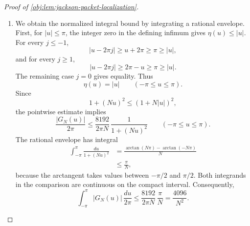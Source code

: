 \documentclass[11pt]{article}
\begin{document}
\begin{proof}[Proof of \cref{obj:lem:jackson-packet-localization}]
\begin{enumerate}
If \(N\eta(u)\leq1\), then
\[
(1+N\eta(u))^2\leq4,
\qquad
|G_N(u)|\leq\frac2N
\leq\frac{8192}{N(1+N\eta(u))^2}.
\]
This case includes \(\eta(u)=0\).

Suppose instead that \(N\eta(u)>1\), so \(\eta(u)>0\). For every integer
\(j_0\), shifting the finite Fourier sum gives
\[
\sum_j a_{j+j_0}^{(\varsigma)}e^{iju}
=e^{-ij_0u}\mathcal F_N^{\varsigma}(u).
\]
Applying this with shifts one and two yields
\[
\sum_j(\delta^2a^{(\varsigma)})_je^{iju}
=(e^{-iu}-1)^2\mathcal F_N^{\varsigma}(u).
\]
Therefore,
\[
|e^{-iu}-1|^2\,|\mathcal F_N^{\varsigma}(u)|
\leq\sum_j|(\delta^2a^{(\varsigma)})_j|
\leq\frac{512}{N^3}.
\]
Periodicity and the elementary sine bound on \([-\pi/2,\pi/2]\) give
\[
|e^{-iu}-1|
=2|\sin(\upsilon(u)/2)|
\geq\frac2\pi|\upsilon(u)|
\geq\frac2\pi\eta(u)
\geq\frac{\eta(u)}2,
\]
where the last inequality uses \(\pi\leq4\). It follows that
\[
|\mathcal F_N^{\varsigma}(u)|
\leq\frac{2048}{N^3\eta(u)^2}.
\]
Applying this estimate at \(u\) and \(-u\) in the representation of \(G_N\) gives
\[
|G_N(u)|\leq\frac{2048}{N^3\eta(u)^2}.
\]
Finally, \(N\eta(u)>1\) implies
\[
(1+N\eta(u))^2\leq4(N\eta(u))^2,
\]
and hence
\[
|G_N(u)|
\leq\frac{2048}{N^3\eta(u)^2}
\leq\frac{8192}{N(1+N\eta(u))^2}.
\]
Together, the two cases establish
\[
|G_N(u)|
\leq\frac{8192}{N(1+N\|u\|_{\mathbb T})^2}
\qquad(u\in\mathbb R).
\]

\item We obtain the normalized integral bound by integrating a rational envelope. First, for \(|u|\leq\pi\), the integer zero in the defining infimum gives
\(\eta(u)\leq|u|\). For every \(j\leq-1\),
\[
|u-2\pi j|\geq u+2\pi\geq\pi\geq|u|,
\]
and for every \(j\geq1\),
\[
|u-2\pi j|\geq2\pi-u\geq\pi\geq|u|.
\]
The remaining case \(j=0\) gives equality. Thus
\[
\eta(u)=|u|\qquad(-\pi\leq u\leq\pi).
\]
Since
\[
1+(Nu)^2\leq(1+N|u|)^2,
\]
the pointwise estimate implies
\[
\frac{|G_N(u)|}{2\pi}
\leq
\frac{8192}{2\pi N}\,
\frac1{1+(Nu)^2}
\qquad(-\pi\leq u\leq\pi).
\]
The rational envelope has integral
\[
\begin{aligned}
\int_{-\pi}^{\pi}\frac{du}{1+(Nu)^2}
&=\frac{\arctan(N\pi)-\arctan(-N\pi)}N\\
&\leq\frac\pi N,
\end{aligned}
\]
because the arctangent takes values between \(-\pi/2\) and \(\pi/2\).
Both integrands in the comparison are continuous on the compact interval.
Consequently,
\[
\int_{-\pi}^{\pi}|G_N(u)|\,\frac{du}{2\pi}
\leq
\frac{8192}{2\pi N}\,\frac\pi N
=\frac{4096}{N^2}.
\]


\end{enumerate}
\end{proof}
\end{document}
